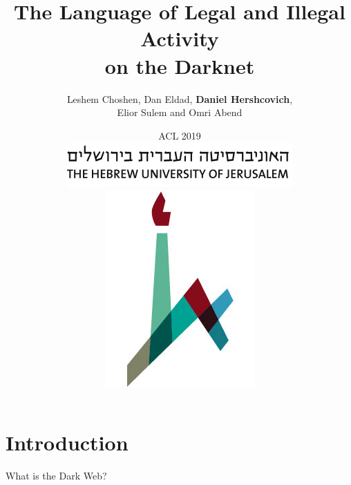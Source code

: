 \documentclass[t,xcolor={svgnames,table}]{beamer}
\begin{document}
\title[]{The Language of Legal and Illegal Activity \\ on the Darknet}
\author[Daniel Hershcovich]{Leshem Choshen, Dan Eldad, \textbf{Daniel Hershcovich}, \\
Elior Sulem and Omri Abend }
\date[]{ACL 2019 \\
	\hspace{0.5cm}
\includegraphics[width=.5\textwidth]{huji_banner.png}
\includegraphics[width=.1\textwidth]{huji_logo.jpg}}

\begin{frame}
\titlepage
\end{frame}

\section*{Introduction}

{%
\begin{frame}
	What is the Dark Web?
\end{frame}
}
\end{document}
